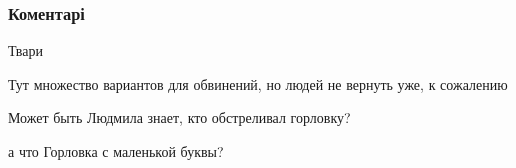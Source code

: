  
 
 
 
 
\subsubsection{Коментарі}

\begin{itemize}
 
Твари

\begin{itemize}
 
Тут множество вариантов для обвинений, но людей не вернуть уже, к сожалению

 
Может быть Людмила знает, кто обстреливал горловку?

 
а что Горловка с маленькой буквы?

 

\end{itemize}
\end{itemize}
